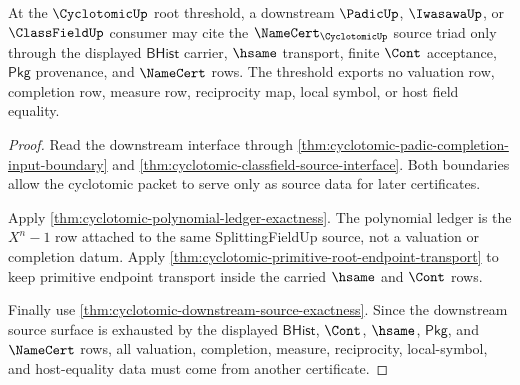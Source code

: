 \begin{theorem}
\label{thm:cyclotomic-downstream-valuation-exclusion}
At the $\CyclotomicUp$ root threshold, a downstream $\PadicUp$,
$\IwasawaUp$, or $\ClassFieldUp$ consumer may cite the
$\NameCert_{\CyclotomicUp}$ source triad only through the displayed
$\mathsf{BHist}$ carrier, $\hsame$ transport, finite $\Cont$ acceptance,
$\mathsf{Pkg}$ provenance, and $\NameCert$ rows. The threshold exports no
valuation row, completion row, measure row, reciprocity map, local symbol, or
host field equality.
\end{theorem}
\begin{proof}
Read the downstream interface through
\autoref{thm:cyclotomic-padic-completion-input-boundary} and
\autoref{thm:cyclotomic-classfield-source-interface}. Both boundaries allow
the cyclotomic packet to serve only as source data for later certificates.

Apply \autoref{thm:cyclotomic-polynomial-ledger-exactness}. The polynomial
ledger is the $X^n-1$ row attached to the same SplittingFieldUp source, not a
valuation or completion datum. Apply
\autoref{thm:cyclotomic-primitive-root-endpoint-transport} to keep primitive
endpoint transport inside the carried $\hsame$ and $\Cont$ rows.

Finally use \autoref{thm:cyclotomic-downstream-source-exactness}. Since the
downstream source surface is exhausted by the displayed $\mathsf{BHist}$,
$\Cont$, $\hsame$, $\mathsf{Pkg}$, and $\NameCert$ rows, all valuation,
completion, measure, reciprocity, local-symbol, and host-equality data must
come from another certificate.
\end{proof}

